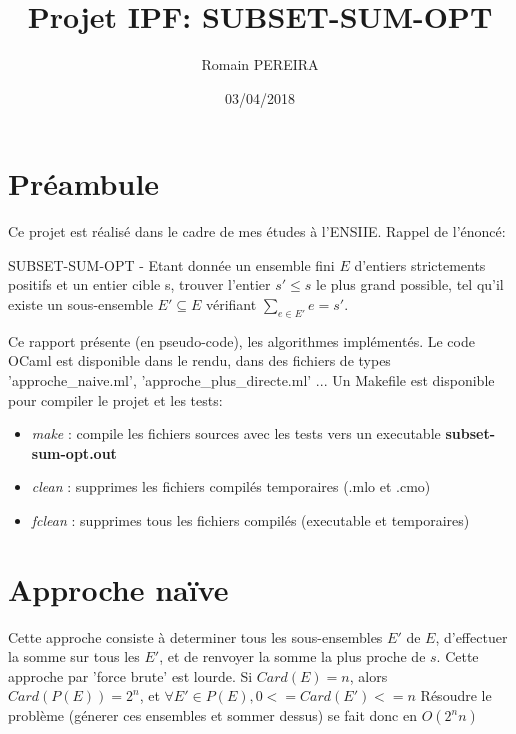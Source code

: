 \documentclass[10pt]{article}
\title{Projet IPF: SUBSET-SUM-OPT}
\author{Romain PEREIRA}
\date{03/04/2018}
\begin{document}
	\maketitle
	\tableofcontents

	\section*{Préambule}

		Ce projet est réalisé dans le cadre de mes études à l'ENSIIE. Rappel de l'énoncé:
		
		\begin{addmargin}[2em]{0em}
			SUBSET-SUM-OPT - Etant donnée un ensemble fini $E$ d'entiers
			strictements positifs et un entier cible s, trouver l'entier
			$s' \leq s$ le plus grand possible, tel qu'il existe un
			sous-ensemble $E' \subseteq E$ vérifiant $\sum_{e \in E'}{e} = s'$.
			\newline
		\end{addmargin}
		Ce rapport présente (en pseudo-code), les algorithmes implémentés.
		Le code OCaml est disponible dans le rendu, dans des fichiers de types 'approche\_naive.ml', 'approche\_plus\_directe.ml' ...
		\newline
		\newline
		Un Makefile est disponible pour compiler le projet et les tests:
		\begin{itemize}[label=-]
			\setlength\itemsep{0.1em}
			\item \textit{make} : compile les fichiers sources avec les tests vers un executable \textbf{subset-sum-opt.out}
			\item \textit{clean} : supprimes les fichiers compilés temporaires (.mlo et .cmo)
			\item \textit{fclean} : supprimes tous les fichiers compilés (executable et temporaires)
		\end{itemize}
	
	\newpage
	\section{Approche naïve}\label{approche_naive}
		Cette approche consiste à determiner tous les sous-ensembles $E'$ de $E$, d'effectuer la somme sur
		tous les $E'$, et de renvoyer la somme la plus proche de $s$. Cette approche par 'force brute' est lourde.
		\newline
		\newline
		Si $Card(E) = n$, alors $Card(P(E)) = 2^n$, et $\forall E' \in P(E) , 0 <= Card(E') <= n$
		\newline
		Résoudre le problème (génerer ces ensembles et sommer dessus) se fait donc en $\boxed{O(2^nn)}$
\end{document}
